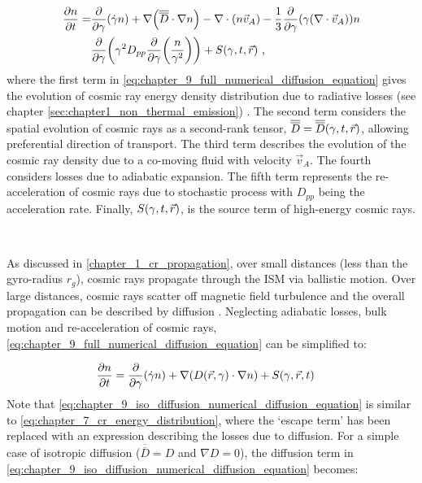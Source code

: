 \begin{equation}
    \begin{aligned}
        \pdv{n}{t}=&\pdv{ }{\gamma}\qty(\dot{\gamma}n)+\nabla\qty(\overline{\overline{D}}\cdot\nabla n)-\nabla\cdot\qty(n\vec{v}_A)-\frac{1}{3}\pdv{ }{\gamma}\qty(\gamma\qty(\nabla\cdot\vec{v}_A))n \\
        &\pdv{ }{\gamma}\qty(\gamma^2 D_{pp}\pdv{ }{\gamma}\qty(\frac{n}{\gamma^2})) + S\qty(\gamma,t,\vec{r})  \text{ ,}     
    \end{aligned} \label{eq:chapter_9_full_numerical_diffusion_equation}
\end{equation} 
\noindent where the first term in \autoref{eq:chapter_9_full_numerical_diffusion_equation} gives the evolution of cosmic ray energy density distribution due to radiative losses (see chapter \autoref{sec:chapter1_non_thermal_emission}) . The second term considers the spatial evolution of cosmic rays as a second-rank tensor, $\overline{\overline{D}}=\overline{\overline{D}}\qty(\gamma,t,\vec{r})$, allowing preferential direction of transport. The third term describes the evolution of the cosmic ray density due to a co-moving fluid with velocity $\vec{v}_A$. The fourth considers losses due to adiabatic expansion. The fifth term represents the re-acceleration of cosmic rays due to stochastic process with $D_{pp}$ being the acceleration rate. Finally, $S\qty(\gamma,t,\vec{r})$, is the source term of high-energy cosmic rays.
\par~\par
As discussed in \autoref{chapter_1_cr_propagation}, over small distances (less than the gyro-radius $r_g$), cosmic rays propagate through the ISM via ballistic motion. Over large distances, cosmic rays scatter off magnetic field turbulence and the overall propagation can be described by diffusion \citep{2015PhRvD..92h3003P}. Neglecting adiabatic losses, bulk motion and re-acceleration of cosmic rays, \autoref{eq:chapter_9_full_numerical_diffusion_equation} can be simplified to:


\begin{equation}
\begin{aligned}
\pdv{n}{t}&=\pdv{ }{\gamma}\qty(\dot{\gamma}n) + \nabla\qty(D\qty(\vec{r},\gamma)\cdot \nabla n) + S\qty(\gamma,\vec{r},t)
\end{aligned} \label{eq:chapter_9_iso_diffusion_numerical_diffusion_equation}
\end{equation} 
\noindent Note that \autoref{eq:chapter_9_iso_diffusion_numerical_diffusion_equation} is similar to \autoref{eq:chapter_7_cr_energy_distribution}, where the `escape term' has been replaced with an expression describing the losses due to diffusion. For a simple case of isotropic diffusion ($\overline{\overline{D}}=D$ and $\nabla D=0$), the diffusion term in \autoref{eq:chapter_9_iso_diffusion_numerical_diffusion_equation} becomes: 


